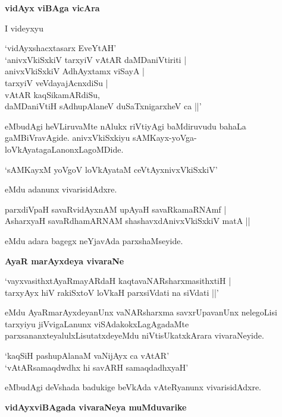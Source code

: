 \noindent
\textbf{vidAyx viBAga vicAra}\label{page89}

I videyxyu 

\begin{shloka}
`vidAyxshacxtasarx EveYtAH'\\
`anivxVkiSxkiV tarxyiV vAtAR daMDaniVtiriti |\\
anivxVkiSxkiV AdhAyxtamx viSayA |\\\label{89}
tarxyiV veVdayajAcnxdiSu |\\
vAtAR kaqSikamARdiSu,\\
daMDaniVtiH sAdhupAlaneV duSaTxnigarxheV ca ||'
\end{shloka}

eMbudAgi heVLiruvaMte nAlukx riVtiyAgi baMdiruvudu bahaLa gaMBiVravAgide. anivxVkiSxkiyu sAMKayx-yoVga-loVkAyatagaLanonxLagoMDide.

\begin{shloka}
`sAMKayxM yoVgoV loVkAyataM ceVtAyxnivxVkiSxkiV'\label{89}
\end{shloka}

eMdu adanunx vivarisidAdxre.

\begin{shloka}
parxdiVpaH savaRvidAyxnAM upAyaH savaRkamaRNAmf |\\\label{89}
AsharxyaH savaRdhamARNAM shashavxdAnivxVkiSxkiV matA ||
\end{shloka}

eMdu adara bagegx neYjavAda parxshaMseyide.

\noindent
\textbf{AyaR marAyxdeya vivaraNe}\label{page90}

\begin{shloka}
`vayxvasithxtAyaRmayARdaH kaqtavaNARsharxmasithxtiH |\\\label{90}
tarxyAyx hiV rakiSxtoV  loVkaH parxsiVdati na siVdati ||'
\end{shloka}

eMdu AyaRmarAyxdeyanUnx vaNARsharxma savxrUpavanUnx nelegoLisi tarxyiyu jiVvigaLanunx viSAdakokxLagAgadaMte parxsananxteyalulxLisutatxdeyeMdu niVtisUkatxkArara vivaraNeyide.

\begin{shloka}
`kaqSiH pashupAlanaM vaNijAyx ca vAtAR'\\\label{90}
`vAtARsamaqdwdhx hi savARH samaqdadhxyaH'\label{90}
\end{shloka}

eMbudAgi deVshada badukige beVkAda vAteRyanunx vivarisidAdxre.

\noindent
\textbf{vidAyxviBAgada vivaraNeya muMduvarike}\label{page90}


